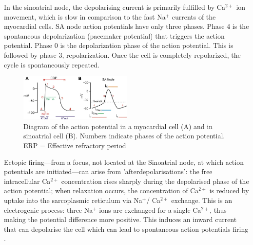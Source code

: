 \documentclass[twocolumn]{article}
\begin{document}




In the sinoatrial node, the depolarising current is primarily fulfilled by Ca$^{2+}$ ion movement, which is slow in comparison to the fast Na$^{+}$ currents of the myocardial cells. SA node action potentials have only three phases. Phase 4 is the spontaneous depolarization (pacemaker potential) that triggers the action potential. Phase 0 is the depolarization phase of the action potential. This is followed by phase 3, repolarization. Once the cell is completely repolarized, the cycle is spontaneously repeated.


\begin{figure}
\caption[short title]{Diagram of the action potential in a myocardial cell (A) and in sinoatrial cell (B). Numbers indicate phases of the action potential.  ERP = Effective refractory period \cite{Mizzi}}
\centering
\includegraphics[width = 0.5\textwidth]{newactionpot}
\end{figure}

Ectopic firing---from a focus, not located at the Sinoatrial node, at which action potentials are initiated---can arise from 'afterdepolarisations': the free intracellular Ca$^{2+}$ concentration rises sharply during the depolarised phase of the action potential; when relaxation occurs, the concentration of Ca$^{2+}$  is reduced by uptake into the sarcoplasmic reticulum via Na$^{+}$/ Ca$^{2+}$  exchange. This is an electrogenic process: three Na$^{+}$ ions are exchanged for a single Ca$^{2+}$, thus making the potential difference more positive. This induces an inward current that can depolarise the cell which can lead to spontaneous action potentials firing \cite{Nattel2}. 
\end{document}

